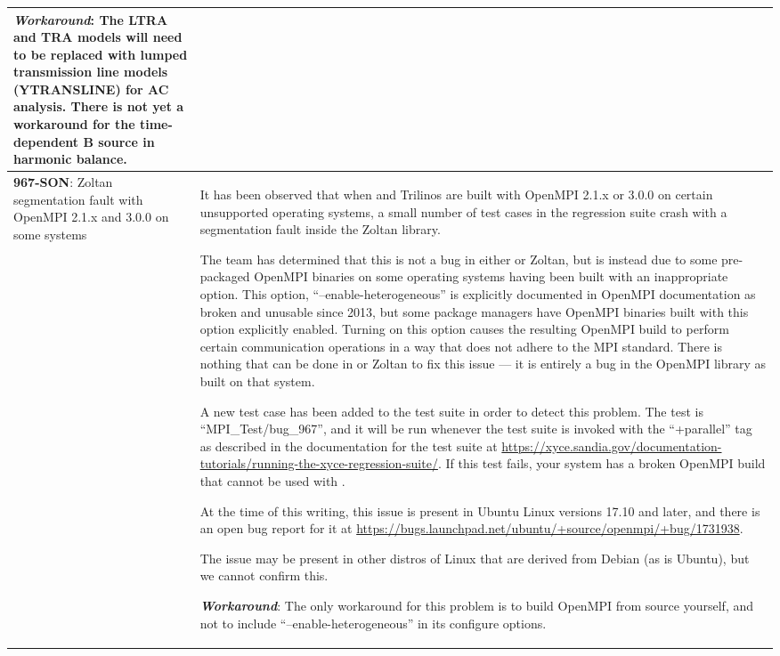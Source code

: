 {\begin{longtable}[h] {>{\raggedright\small}m{2in}|>{\raggedright\let\\\tabularnewline\small}m{3.5in}}
\textbf{\textit{Workaround}}: The LTRA and TRA models will need to be replaced
with lumped transmission line models (YTRANSLINE) for AC analysis.
There is not yet a workaround for the time-dependent B source in
harmonic balance.
\\ \hline

\textbf{967-SON}: Zoltan segmentation fault with OpenMPI 2.1.x and 3.0.0 on
some systems &

It has been observed that when \Xyce{} and Trilinos are built with
OpenMPI 2.1.x or 3.0.0 on certain unsupported operating systems, a
small number of test cases in the regression suite crash with a
segmentation fault inside the Zoltan library.

The \Xyce{} team has determined that this is not a bug in
either \Xyce{} or Zoltan, but is instead due to some pre-packaged OpenMPI
binaries on some operating systems having been built with an
inappropriate option.  This option, ``--enable-heterogeneous'' is
explicitly documented in OpenMPI documentation as broken and unusable
since 2013, but some package managers have OpenMPI binaries built with
this option explicitly enabled.  Turning on this option causes the
resulting OpenMPI build to perform certain communication operations in
a way that does not adhere to the MPI standard.  There is nothing that
can be done in \Xyce{} or Zoltan to fix this issue --- it is entirely
a bug in the OpenMPI library as built on that system.

A new test case has been added to the \Xyce{} test suite in order to
detect this problem.  The test is ``MPI\_Test/bug\_967'', and it will
be run whenever the test suite is invoked with the ``+parallel'' tag
as described in the documentation for the test suite
at \url{https://xyce.sandia.gov/documentation-tutorials/running-the-xyce-regression-suite/}.
If this test fails, your system has a broken OpenMPI build that cannot
be used with \Xyce{}.

At the time of this writing, this issue is present in Ubuntu Linux
versions 17.10 and later, and there is an open bug report for it
at \url{https://bugs.launchpad.net/ubuntu/+source/openmpi/+bug/1731938}.

The issue may be present in other distros of Linux that are derived
from Debian (as is Ubuntu), but we cannot confirm this.

\textbf{\textit{Workaround}}:
The only workaround for this problem is to build OpenMPI from source
yourself, and not to include ``--enable-heterogeneous'' in its
configure options.


\end{longtable}}
